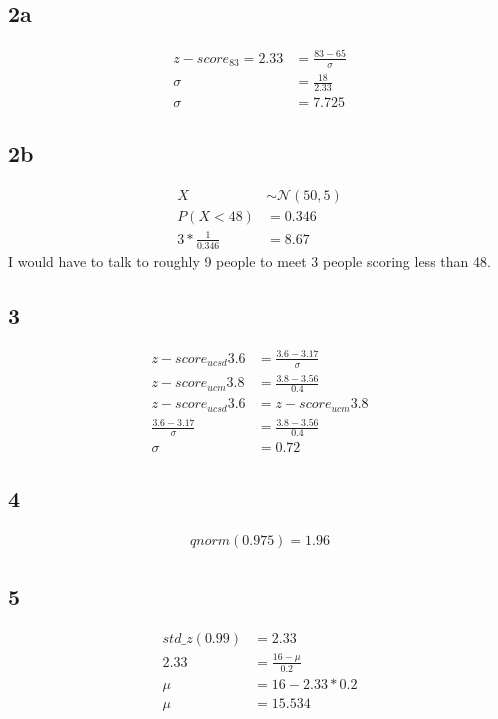 \documentclass{article}
\begin{document}
\subsection*{2a}
\begin{align*}
z-score_{83} = 2.33 &= \frac{83-65}{\sigma}\\
						 \sigma &= \frac{18}{2.33}\\
						 \sigma &= 7.725
\end{align*}

\subsection*{2b}
\begin{align*}
	X &\sim \mathcal{N}(50, 5)\\
	P(X < 48) &= 0.346\\
	3*\frac{1}{0.346} &=  8.67
\end{align*}
I would have to talk to roughly 9 people to meet 3 people scoring less than 48.

\subsection*{3}
\begin{align*}
	z-score_{ucsd}{3.6} &= \frac{3.6-3.17}{\sigma}\\
	z-score_{ucm}{3.8} &= \frac{3.8-3.56}{0.4}\\
	z-score_{ucsd}{3.6} &= z-score_{ucm}{3.8}\\
	 \frac{3.6-3.17}{\sigma} &= \frac{3.8-3.56}{0.4}\\
	 \sigma &= 0.72
\end{align*}

\subsection*{4}
\begin{align*}
qnorm(0.975) = 1.96
\end{align*}

\subsection*{5}
\begin{align*}
	std\_z(0.99) &= 2.33\\
	2.33 &= \frac{16 - \mu}{0.2}\\
	\mu &= 16 - 2.33 * 0.2\\
	\mu &= 15.534
\end{align*}
\end{document}
